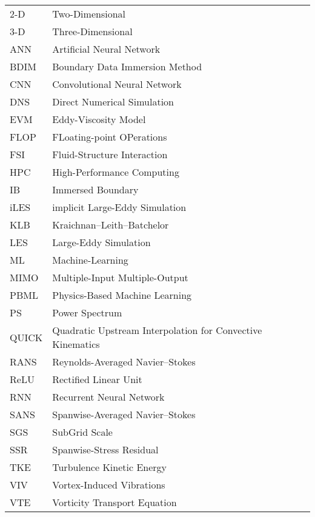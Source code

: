 \begin{longtable}[l]{ll}
2-D & Two-Dimensional\tabularnewline
3-D & Three-Dimensional\tabularnewline
ANN & Artificial Neural Network \tabularnewline
BDIM & Boundary Data Immersion Method \tabularnewline
CNN & Convolutional Neural Network \tabularnewline
DNS & Direct Numerical Simulation \tabularnewline
EVM & Eddy-Viscosity Model \tabularnewline
FLOP & FLoating-point OPerations\tabularnewline
FSI & Fluid-Structure Interaction\tabularnewline
HPC & High-Performance Computing \tabularnewline
IB & Immersed Boundary\tabularnewline
iLES & implicit Large-Eddy Simulation\tabularnewline
KLB & Kraichnan--Leith--Batchelor\tabularnewline
LES & Large-Eddy Simulation\tabularnewline
ML & Machine-Learning\tabularnewline
MIMO & Multiple-Input Multiple-Output \tabularnewline
PBML & Physics-Based Machine Learning\tabularnewline
PS & Power Spectrum\tabularnewline
QUICK & Quadratic Upstream Interpolation for Convective Kinematics\tabularnewline
RANS & Reynolds-Averaged Navier--Stokes\tabularnewline
ReLU & Rectified Linear Unit \tabularnewline
RNN & Recurrent Neural Network \tabularnewline
SANS & Spanwise-Averaged Navier--Stokes\tabularnewline
SGS & SubGrid Scale\tabularnewline
SSR & Spanwise-Stress Residual\tabularnewline
TKE & Turbulence Kinetic Energy\tabularnewline
VIV & Vortex-Induced Vibrations\tabularnewline
VTE & Vorticity Transport Equation\tabularnewline
\end{longtable}